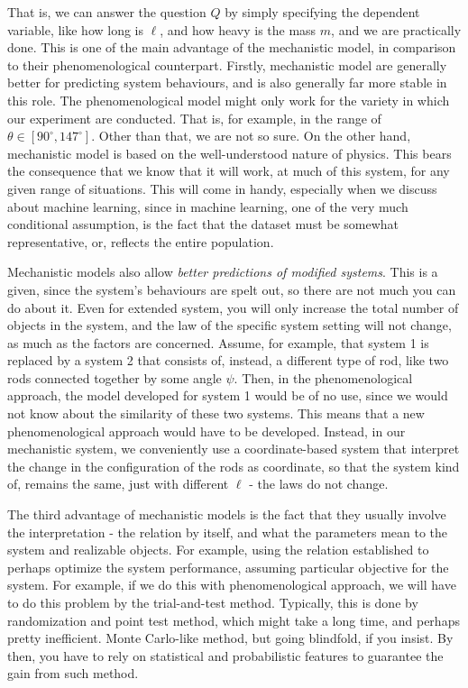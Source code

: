 That is, we can answer the question $Q$ by simply specifying the dependent variable, like how long is $\ell$, and how heavy is the mass $m$, and we are practically done. This is one of the main advantage of the mechanistic model, in comparison to their phenomenological counterpart. Firstly, mechanistic model are generally better for predicting system behaviours, and is also generally far more stable in this role. The phenomenological model might only work for the variety in which our experiment are conducted. That is, for example, in the range of $\theta \in [90^{\circ},147^{\circ}]$. Other than that, we are not so sure. On the other hand, mechanistic model is based on the well-understood nature of physics. This bears the consequence that we know that it will work, at much of this system, for any given range of situations. This will come in handy, especially when we discuss about machine learning, since in machine learning, one of the very much conditional assumption, is the fact that the dataset must be somewhat representative, or, reflects the entire population. 

Mechanistic models also allow \textit{better predictions of modified systems}. This is a given, since the system's behaviours are spelt out, so there are not much you can do about it. Even for extended system, you will only increase the total number of objects in the system, and the law of the specific system setting will not change, as much as the factors are concerned. Assume, for example, that system 1 is replaced by a system 2 that consists of, instead, a different type of rod, like two rods connected together by some angle $\psi$. Then, in the phenomenological approach, the model developed for system 1 would be of no use, since we would not know about the similarity of these two systems. This means that a new phenomenological approach would have to be developed. Instead, in our mechanistic system, we conveniently use a coordinate-based system that interpret the change in the configuration of the rods as coordinate, so that the system kind of, remains the same, just with different $\ell$ - the laws do not change. 

The third advantage of mechanistic models is the fact that they usually involve the interpretation - the relation by itself, and what the parameters mean to the system and realizable objects. For example, using the relation established to perhaps optimize the system performance, assuming particular objective for the system. For example, if we do this with phenomenological approach, we will have to do this problem by the trial-and-test method. Typically, this is done by randomization and point test method, which might take a long time, and perhaps pretty inefficient. Monte Carlo-like method, but going blindfold, if you insist. By then, you have to rely on statistical and probabilistic features to guarantee the gain from such method. 

